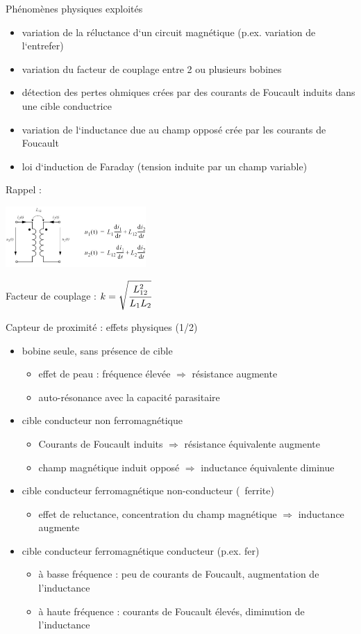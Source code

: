\documentclass[	DIV=calc,%
							paper=a4,%
							fontsize=11pt,%
							twocolumn]{scrartcl} %
\begin{document}
Phénomènes physiques exploités
\begin{itemize}
    \item variation de la réluctance d‘un circuit magnétique (p.ex. variation de l‘entrefer)
    \item variation du facteur de couplage entre 2 ou plusieurs bobines
    \item détection des pertes ohmiques crées par des courants de Foucault induits dans une cible conductrice
    \item variation de l‘inductance due au champ opposé crée par les courants de Foucault
    \item loi d‘induction de Faraday (tension induite par un champ variable)
\end{itemize}

Rappel : 

\includegraphics[width = 0.4\textwidth,center]{img/Rappel_ind.JPG}

Facteur de couplage : $ k = \sqrt{\cfrac{L_{12}^2}{L_1 L_2}}$

Capteur de proximité : effets physiques (1/2)
\begin{itemize}
    \item bobine seule, sans présence de cible
    \begin{itemize}
        \item effet de peau : fréquence élevée $\Rightarrow$ résistance augmente
        \item auto-résonance avec la capacité parasitaire
    \end{itemize}
    \item cible conducteur non ferromagnétique
    \begin{itemize}
        \item Courants de Foucault induits $\Rightarrow$ résistance équivalente augmente
        \item champ magnétique induit opposé $\Rightarrow$ inductance équivalente diminue
    \end{itemize}
    \item cible conducteur ferromagnétique non-conducteur (~ferrite)
    \begin{itemize}
        \item effet de reluctance, concentration du champ magnétique $\Rightarrow$ inductance augmente 
    \end{itemize}
    \item cible conducteur ferromagnétique conducteur (p.ex. fer)
    \begin{itemize}
        \item à basse fréquence : peu de courants de Foucault, augmentation de l'inductance
        \item à haute fréquence : courants de Foucault élevés, diminution de l'inductance
    \end{itemize}
\end{itemize}
\end{document}
